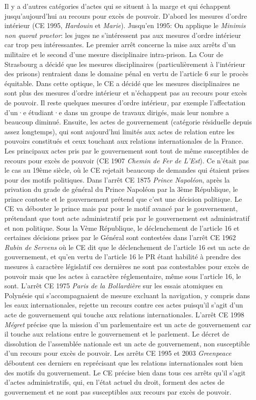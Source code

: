 \documentclass[math]{cours}
\begin{document}
Il y a d'autres catégories d'actes qui se situent à la marge et qui échappent jusqu'aujourd'hui au recours pour excès de pouvoir.
D'abord les mesures d'ordre intérieur (CE 1995, \emph{Hardouin} et \emph{Marie}). Jusqu'en 1995: On applique le \emph{Minimis non quorat praetor}: les juges ne s'intéressent pas aux mesures d'ordre intérieur car trop peu intéressantes.
Le premier arrêt concerne la mise aux arrêts d'un militaire et le second d'une mesure disciplinaire intra-prison.
La Cour de Strasbourg a décidé que les mesures disciplinaires (particulièrement à l'intérieur des prisons) rentraient dans le domaine pénal en vertu de l'article 6 sur le procès équitable.
Dans cette optique, le CE a décidé que les mesures disciplinaires ne sont plus des mesures d'ordre intérieur et n'échappent pas au recours pour excès de pouvoir.
Il reste quelques mesures d'ordre intérieur, par exemple l'affectation d'un·e étudiant·e dans un groupe de travaux dirigés, mais leur nombre a beaucoup diminué.
Ensuite, les actes de gouvernement (catégorie résiduelle depuis assez longtemps), qui sont aujourd'hui limités aux actes de relation entre les pouvoirs constitués et ceux touchant aux relations internationales de la France.
Les principaux actes pris par le gouvernement sont tout de même susceptibles de recours pour excès de pouvoir (CE 1907 \emph{Chemin de Fer de L'Est}).
Ce n'était pas le cas au 19ème siècle, où le CE rejetait beaucoup de demandes qui étaient prises pour des motifs politiques.
Dans l'arrêt CE 1875 \emph{Prince Napoléon}, après la privation du grade de général du Prince Napoléon par la 3ème République, le prince conteste et le gouvernement prétend que c'est une décision politique.
Le CE va débouter le prince mais par pour le motif avancé par le gouvernement, prétendant que tout acte administratif pris par le gouvernement est administratif et non politique.
Sous la Vème République, le déclenchement de l'article 16 et certaines décisions prises par le Général sont contestées dans l'arrêt CE 1962 \emph{Rubin de Servens} où le CE dit que le déclenchement de l'article 16 est un acte de gouvernement, et qu'en vertu de l'article 16 le PR étant habilité à prendre des mesures à caractère législatif ces dernières ne sont pas contestables pour excès de pouvoir mais que les actes à caractère réglementaire, même sous l'article 16, le sont.
L'arrêt CE 1975 \emph{Paris de la Bollardière} sur les essais atomiques en Polynésie qui s'accompagnaient de mesure excluant la navigation, y compris dans les eaux internationales, rejette un recours contre ces actes puisqu'il s'agit d'un acte de gouvernement qui touche aux relations internationales.
L'arrêt CE 1998 \emph{Mégret} précise que la mission d'un parlementaire est un acte de gouvernement car il touche aux relations entre le gouvernement et le parlement. Le décret de dissolution de l'assemblée nationale est un acte de gouvernement, non susceptible d'un recours pour excès de pouvoir.
Les arrêts CE 1995 et 2003 \emph{Greenpeace} déboutent ces derniers en reprécisant que les relations internationales sont bien des motifs du gouvernement.
Le CE précise bien dans tous ces arrêts qu'il s'agit d'actes administratifs, qui, en l'état actuel du droit, forment des actes de gouvernement et ne sont pas susceptibles aux recours par excès de pouvoir.
\end{document}
